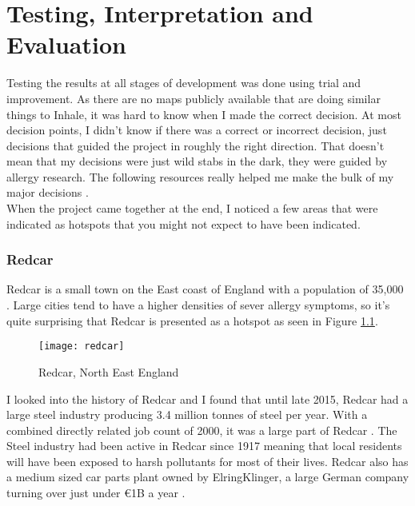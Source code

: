 \chapter{Testing, Interpretation and Evaluation}
\label{cha:tande}
 
Testing the results at all stages of development was done using trial and improvement. As there are no maps publicly available that are doing similar things to Inhale, it was hard to know when I made the correct decision. At most decision points, I didn't know if there was a correct or incorrect decision, just decisions that guided the project in roughly the right direction. That doesn't mean that my decisions were just wild stabs in the dark, they were guided by allergy research. The following resources really helped me make the bulk of my major decisions \cite{childhood, rhinitis, co2pollen, waldo}.\\
 
When the project came together at the end, I noticed a few areas that were indicated as hotspots that you might not expect to have been indicated.

\subsection{Redcar}

Redcar is a small town on the East coast of England with a population of 35,000 \cite{redcarpop}. Large cities tend to have a higher densities of sever allergy symptoms, so it's quite surprising that Redcar is presented as a hotspot as seen in Figure \ref{fig:redcar}.\\

\begin{figure}[H]
\begin{center}
\texttt{[image: redcar]}
\caption{Redcar, North East England}
\label{fig:redcar}
\end{center}
\end{figure}

I looked into the history of Redcar and I found that until late 2015, Redcar had a large steel industry producing 3.4 million tonnes of steel per year. With a combined directly related job count of 2000, it was a large part of Redcar \cite{bbcredcar}. The Steel industry had been active in Redcar since 1917 meaning that local residents will have been exposed to harsh pollutants for most of their lives. Redcar also has a medium sized car parts plant owned by ElringKlinger, a large German company turning over just under €1B a year \cite{guardez}.\\

